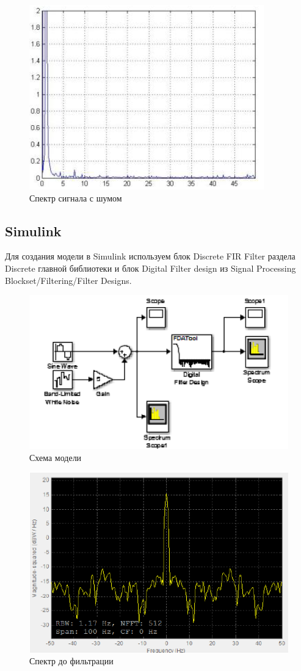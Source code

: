 \documentclass[a4paper, 12pt]{article}
\begin{document}
\begin{figure}[H]
   \includegraphics[scale=0.7]{lab6/4.png}
   \caption{Спектр сигнала с шумом}
\end{figure}

\subsection{Simulink}
Для создания модели в Simulink
используем блок Discrete FIR Filter раздела Discrete главной библиотеки и
блок Digital Filter design из Signal Processing Blockset/Filtering/Filter Designs.

\begin{figure}[H]
   \includegraphics[scale=0.7]{lab6/5.png}
   \caption{Схема модели}
\end{figure}

\begin{figure}[H]
   \includegraphics[scale=0.7]{lab6/6.png}
   \caption{Спектр до фильтрации}
\end{figure}
\end{document}
